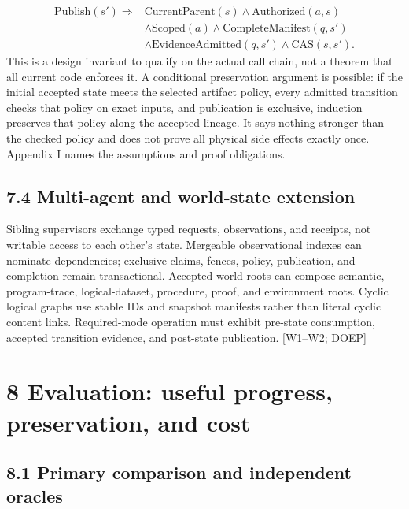 \documentclass{article}
\begin{document}
\setcounter{equation}{1}
\begin{equation}\begin{aligned}
\mathrm{Publish}(s')\Rightarrow{}&\mathrm{CurrentParent}(s)\land\mathrm{Authorized}(a,s)\\
&\land\mathrm{Scoped}(a)\land\mathrm{CompleteManifest}(q,s')\\
&\land\mathrm{EvidenceAdmitted}(q,s')\land\mathrm{CAS}(s,s').
\end{aligned}\tag{2}\end{equation}
This is a design invariant to qualify on the actual call chain, not a theorem that all current code
enforces it. A conditional preservation argument is possible: if the initial accepted state meets the
selected artifact policy, every admitted transition checks that policy on exact inputs, and publication
is exclusive, induction preserves that policy along the accepted lineage. It says nothing stronger than
the checked policy and does not prove all physical side effects exactly once. Appendix I names the
assumptions and proof obligations.

\subsection*{7.4 Multi-agent and world-state extension}

Sibling supervisors exchange typed requests, observations, and receipts, not writable access to
each other’s state. Mergeable observational indexes can nominate dependencies; exclusive claims,
fences, policy, publication, and completion remain transactional. Accepted world roots can compose
semantic, program-trace, logical-dataset, procedure, proof, and environment roots. Cyclic logical
graphs use stable IDs and snapshot manifests rather than literal cyclic content links. Required-mode
operation must exhibit pre-state consumption, accepted transition evidence, and post-state publication.
[W1–W2; DOEP]

\section*{8 Evaluation: useful progress, preservation, and cost}
\subsection*{8.1 Primary comparison and independent oracles}
\end{document}
